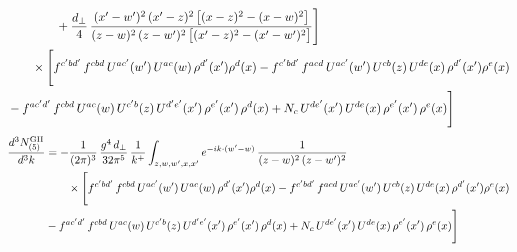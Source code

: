 \documentclass[10pt]{article}
\begin{document}
\begin{align}
&\qquad\qquad+\frac{d_{\perp}}{4}\,\frac{(x^{\prime}-w^{\prime})^{2}\,(x^{\prime}-z)^{2}\,\big[(x-z)^{2}-(x-w)^{2}\big]}{(z-w)^{2}\,(z-w^{\prime})^{2}\,\big[(x^{\prime}-z)^{2}-(x^{\prime}-w^{\prime})^{2}\big]}\Bigg]\notag\\
&\qquad\times\Bigg[f^{c^{\prime}bd^{\prime}}\,f^{cbd}\, U^{ac^{\prime}}(w^{\prime})\,U^{ac}(w)\,\rho^{d^{\prime}}(x^{\prime})\rho^{d}(x)- f^{c^{\prime}bd^{\prime}}\,f^{acd}\,U^{ac^{\prime}}(w^{\prime})\,U^{cb}(z)\,U^{de}(x)\,\rho^{d^{\prime}}(x^{\prime})\rho^{e}(x) \notag \\ & -f^{ac^{\prime}d^{\prime}}\,f^{cbd}\,U^{ac}(w)\,U^{c^{\prime}b}(z)\,U^{d^{\prime}e^{\prime}}(x^{\prime})\,\rho^{e^{\prime}}(x^{\prime})\,\rho^{d}(x) +N_{c}\,U^{de^{\prime}}(x^{\prime})\,U^{de}(x)\,\rho^{e^{\prime}}(x^{\prime})\,\rho^{e}(x)\Bigg]
\end{align}
\begin{align}
\frac{d^{3}N^{\rm GII}_{(5)}}{d^{3}k}&=-\frac{1}{(2\pi)^{3}}\,\frac{g^{4}\,d_{\perp}}{32\pi^{5}}\,\frac{1}{k^{+}}\int_{z,w,w^{\prime},x,x^{\prime}}e^{-ik\cdot(w^{\prime}-w)}\,\frac{1}{(z-w)^{2}\,(z-w^{\prime})^{2}}\notag\\
&\qquad\times\Bigg[f^{c^{\prime}bd^{\prime}}\,f^{cbd}\, U^{ac^{\prime}}(w^{\prime})\,U^{ac}(w)\,\rho^{d^{\prime}}(x^{\prime})\rho^{d}(x)- f^{c^{\prime}bd^{\prime}}\,f^{acd}\,U^{ac^{\prime}}(w^{\prime})\,U^{cb}(z)\,U^{de}(x)\,\rho^{d^{\prime}}(x^{\prime})\rho^{e}(x) \notag \\ & -f^{ac^{\prime}d^{\prime}}\,f^{cbd}\,U^{ac}(w)\,U^{c^{\prime}b}(z)\,U^{d^{\prime}e^{\prime}}(x^{\prime})\,\rho^{e^{\prime}}(x^{\prime})\,\rho^{d}(x) +N_{c}\,U^{de^{\prime}}(x^{\prime})\,U^{de}(x)\,\rho^{e^{\prime}}(x^{\prime})\,\rho^{e}(x)\Bigg]
\end{align}
\end{document}
